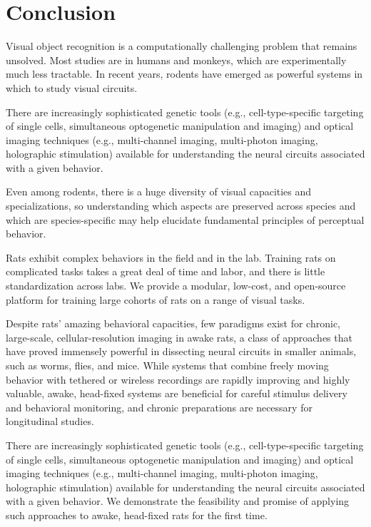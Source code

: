\chapter{Conclusion}
\label{conclusion}

Visual object recognition is a computationally challenging problem that remains unsolved. Most studies are in humans and monkeys, which are experimentally much less tractable. In recent years, rodents have emerged as powerful systems in which to study visual circuits. 

There are increasingly sophisticated genetic tools (e.g., cell-type-specific targeting of single cells, simultaneous optogenetic manipulation and imaging) and optical imaging techniques (e.g., multi-channel imaging, multi-photon imaging, holographic stimulation) available for understanding the neural circuits associated with a given behavior. 


Even among rodents, there is a huge diversity of visual capacities and specializations, so understanding which aspects are preserved across species and which are species-specific may help elucidate fundamental principles of perceptual behavior. 

Rats exhibit complex behaviors in the field and in the lab. Training rats on complicated tasks takes a great deal of time and labor, and there is little standardization across labs. We provide a modular, low-cost, and open-source platform for training large cohorts of rats on a range of visual tasks.

Despite rats’ amazing behavioral capacities, few paradigms exist for chronic, large-scale, cellular-resolution imaging in awake rats, a class of approaches that have proved immensely powerful in dissecting neural circuits in smaller animals, such as worms, flies, and mice. While systems that combine freely moving behavior with tethered or wireless recordings are rapidly improving and highly valuable, awake, head-fixed systems are beneficial for careful stimulus delivery and behavioral monitoring, and chronic preparations are necessary for longitudinal studies.   

There are increasingly sophisticated genetic tools (e.g., cell-type-specific targeting of single cells, simultaneous optogenetic manipulation and imaging) and optical imaging techniques (e.g., multi-channel imaging, multi-photon imaging, holographic stimulation) available for understanding the neural circuits associated with a given behavior. We demonstrate the feasibility and promise of applying such approaches to awake, head-fixed rats for the first time. 

